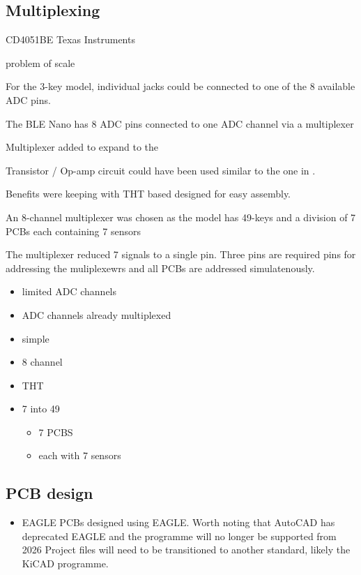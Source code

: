 \subsection{Multiplexing}\label{multiplexing}

CD4051BE Texas Instruments

problem of scale

For the 3-key model, individual jacks could be connected to one of the 8
available ADC pins.

The BLE Nano has 8 ADC pins connected to one ADC channel via a
multiplexer

Multiplexer added to expand to the

Transistor / Op-amp circuit could have been used similar to the one in
\cite{McPherson2013}.

Benefits were keeping with THT based designed for easy assembly.

An 8-channel multiplexer was chosen as the model has 49-keys and a
division of 7 PCBs each containing 7 sensors

The multiplexer reduced 7 signals to a single pin. Three pins are
required pins for addressing the muliplexewrs and all PCBs are addressed
simulatenously.

\begin{itemize}
\item
  limited ADC channels
\item
  ADC channels already multiplexed
\item
  simple
\item
  8 channel
\item
  THT
\item
  7 into 49

  \begin{itemize}
  \item
    7 PCBS
  \item
    each with 7 sensors
  \end{itemize}
\end{itemize}

\subsection{PCB design}\label{pcb-design}

\begin{itemize}
\item
  EAGLE PCBs designed using EAGLE. Worth noting that AutoCAD has
  deprecated EAGLE and the programme will no longer be supported from
  2026 Project files will need to be transitioned to another standard,
  likely the KiCAD programme.
\end{itemize}

